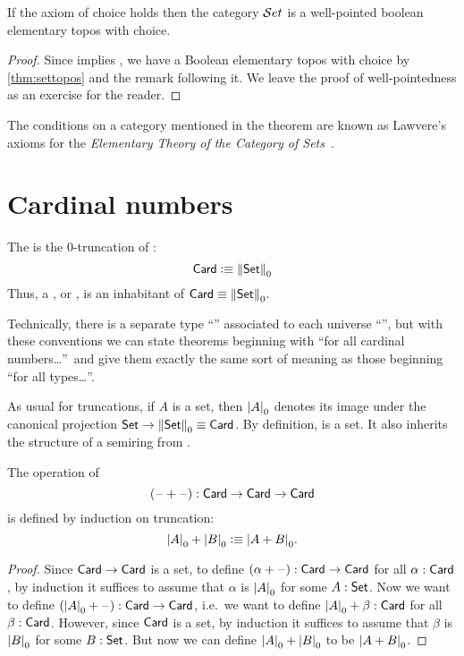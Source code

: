 \begin{thm}\label{thm:ETCS}
  If the axiom of choice holds then the category $\mathcal{S}et$ is a well-pointed boolean elementary topos with choice.  
\end{thm}

\begin{proof}
  Since \choice{} implies \LEM{}, we have a Boolean elementary topos with choice by \autoref{thm:settopos} and the remark following it.  We leave the proof of well-pointedness as
an exercise for the reader.
\end{proof}

\begin{rmk}
  The conditions on a category mentioned in the theorem are known as Lawvere's
  axioms for the \emph{Elementary Theory of the Category of
    Sets}~\cite{lawvere:etcs-long}.
\end{rmk}

\section{Cardinal numbers}
\label{sec:cardinals}

\begin{defn}\label{defn:card}
  The  is the 0-truncation of \set:
  \[ \mathsf{Card} \vcentcolon\equiv \mathopen{}\left\Vert \mathsf{Set}\right\Vert_{0}\mathclose{} \]
  Thus, a , or , is an inhabitant of $\mathsf{Card}\equiv \mathopen{}\left\Vert \mathsf{Set}\right\Vert_{0}\mathclose{}$.
\end{defn}

\begin{rmk}
  Technically, there is a separate type ``\card'' associated to each universe ``\type'', but with these conventions we can state theorems beginning with ``for all cardinal numbers\dots''\ and give them exactly the same sort of meaning as those beginning ``for all types\dots''.
\end{rmk}

As usual for truncations, if $A$ is a set, then $\mathopen{}\left|A\right|_{0}^{}\mathclose{}$ denotes its image under the canonical projection $\mathsf{Set} \to \mathopen{}\left\Vert \mathsf{Set}\right\Vert_{0}\mathclose{} \equiv \mathsf{Card}$.
By definition, \card is a set.
It also inherits the structure of a semiring from \set.

\begin{defn}
  The operation of 
  \[ (\mathord{\hspace{1pt}\text{--}\hspace{1pt}}+\mathord{\hspace{1pt}\text{--}\hspace{1pt}}) : \mathsf{Card} \to \mathsf{Card} \to \mathsf{Card} \]
  is defined by induction on truncation:
  \[ \mathopen{}\left|A\right|_{0}^{}\mathclose{} + \mathopen{}\left|B\right|_{0}^{}\mathclose{} \vcentcolon\equiv \mathopen{}\left|A+B\right|_{0}^{}\mathclose{} .\]
\end{defn}
\begin{proof}
  Since $\mathsf{Card}\to\mathsf{Card}$ is a set, to define $(\alpha+\mathord{\hspace{1pt}\text{--}\hspace{1pt}}):\mathsf{Card}\to\mathsf{Card}$ for all $\alpha:\mathsf{Card}$, by induction it suffices to assume that $\alpha$ is $\mathopen{}\left|A\right|_{0}^{}\mathclose{}$ for some $A:\mathsf{Set}$.
  Now we want to define $(\mathopen{}\left|A\right|_{0}^{}\mathclose{}+\mathord{\hspace{1pt}\text{--}\hspace{1pt}}) :\mathsf{Card}\to\mathsf{Card}$, i.e.\ we want to define $\mathopen{}\left|A\right|_{0}^{}\mathclose{}+\beta :\mathsf{Card}$ for all $\beta:\mathsf{Card}$.
  However, since $\mathsf{Card}$ is a set, by induction it suffices to assume that $\beta$ is $\mathopen{}\left|B\right|_{0}^{}\mathclose{}$ for some $B:\mathsf{Set}$.
  But now we can define $\mathopen{}\left|A\right|_{0}^{}\mathclose{}+\mathopen{}\left|B\right|_{0}^{}\mathclose{}$ to be $\mathopen{}\left|A+B\right|_{0}^{}\mathclose{}$.
\end{proof}

